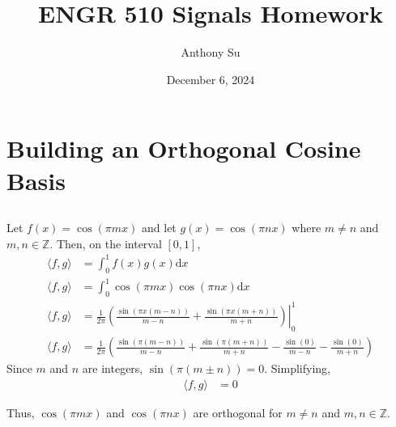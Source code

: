 \documentclass[11pt]{article}
\title{ENGR 510 Signals Homework}
\author{Anthony Su}
\date{December 6, 2024}
\begin{document}
\thispagestyle{plain}
\maketitle


\section{Building an Orthogonal Cosine Basis}

\subsection{} %
Let $f(x) = \cos(\pi m x)$ and let $g(x) = \cos(\pi n x)$ where $m \neq n$ and
$m, n \in \mathbb{Z}$.
Then, on the interval $[0, 1]$,
\begin{align*}
    \langle f, g \rangle &= \int_0^1 f(x) g(x) \mathrm{d}x \\
    \langle f, g \rangle &= \int_0^1 \cos(\pi m x) \cos(\pi n x) \mathrm{d}x \\
    \langle f, g \rangle &= \left.\frac{1}{2 \pi}\left(
        \frac{\sin(\pi x (m-n))}{m-n} + \frac{\sin(\pi x (m+n))}{m+n}
        \right)\right|_0^1 \\
    \langle f, g \rangle &= \frac{1}{2 \pi}\left(
        \frac{\sin(\pi (m-n))}{m-n} + \frac{\sin(\pi (m+n))}{m+n}
        - \frac{\sin(0)}{m-n} - \frac{\sin(0)}{m+n}
        \right)
\end{align*}
Since $m$ and $n$ are integers, $\sin(\pi (m \pm n))=0$. Simplifying,
\begin{align*}
    \langle f, g \rangle &= 0
\end{align*}
\begin{mdframed}
    Thus, $\cos(\pi m x)$ and $\cos(\pi n x)$ are orthogonal for $m \neq n$ and
    $m, n \in \mathbb{Z}$.
\end{mdframed}
\end{document}
